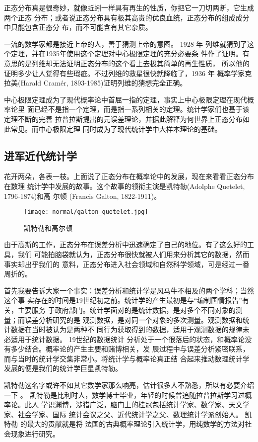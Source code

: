 正态分布真是很奇妙，就像蚯蚓一样具有再生的性质，你把它一刀切两断，它生成两个正态
分布；或者说正态分布具有极其高贵的优良血统，正态分布的组成成分中只能包含正态分
布，而不可能含有其它杂质。

一流的数学家都是接近上帝的人，善于猜测上帝的意图。
1928 年 列维就猜到了这个定理，并在1935年使用这个定理对中心极限定理的充分必要条
件作了证明。有意思的是列维却无法证明正态分布的这个看上去极其简单的再生性质，
所以他的证明多少让人觉得有些瑕疵。不过列维的救星很快就降临了，1936 年
概率学家克拉美(Harald Cram\'{e}r, 1893-1985)证明列维的猜想完全正确。

中心极限定理成为了现代概率论中首屈一指的定理，事实上中心极限定理在现代概率论里
面已经不是指一个定理，而是指一系列相关的定理。统计学家们也基于该定理不断的完善
拉普拉斯提出的元误差理论，并据此解释为何世界上正态分布如此常见。而中心极限定理
同时成为了现代统计学中大样本理论的基础。

\subsection{进军近代统计学}

花开两朵，各表一枝。上面说了正态分布在概率论中的发展，现在来看看正态分布在数理
统计学中发展的故事。这个故事的领衔主演是凯特勒(Adolphe Quetelet, 1796-1874)和高
尔顿 (Francis Galton, 1822-1911)。
\begin{figure}[ht]
\centering
\texttt{[image: normal/galton\_quetelet.jpg]}
\caption{凯特勒和高尔顿}
\end{figure}

由于高斯的工作，正态分布在误差分析中迅速确定了自己的地位。有了这么好的工具，我们
可能拍脑袋就认为，正态分布很快就被人们用来分析其它的数据，然而事实却出乎我们的
意料，正态分布进入社会领域和自然科学领域，可是经过一番周折的。

首先我要告诉大家一个事实：误差分析和统计学是风马牛不相及的两个学科；当然这个事
实存在的时间是19世纪初之前。统计学的产生最初是与“编制国情报告”有关，主要服务
于政府部门。统计学面对的是统计数据，是对多个不同对象的测量；而误差分析研究的是
观测数据，是对同一个对象的多次测量。观测数据和统计数据在当时被认为是两种不
同行为获取得到的数据，适用于观测数据的规律未必适用于统计数据。 19世纪的数据统计
分析处于一个很落后的状态，和概率论没有多少结合。概率论的产生主要和赌博相关，发
展过程中与误差分析紧密联系，而与当时的统计学交集非常小。将统计学与概率论真正结
合起来推动数理统计学发展的便是我们的统计学巨星凯特勒。

凯特勒这名字或许不如其它数学家那么响亮，估计很多人不熟悉，所以有必要介绍一下
。 凯特勒是比利时人，数学博士毕业，年轻的时候曾追随拉普拉斯学习过概率论。此人
学识渊博，涉猎广泛，脑门上的桂冠包括统计学家、数学家、天文学家、社会学家、国际
统计会议之父、近代统计学之父、数理统计学派创始人。 凯特勒 的最大的贡献就是将
法国的古典概率理论引入统计学，用纯数学的方法对社会现象进行研究。

